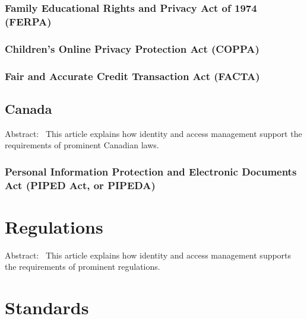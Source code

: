 \hypertarget{family-educational-rights-and-privacy-act-of-1974-ferpa}{%
\subsubsection{Family Educational Rights and Privacy Act of 1974
(FERPA)}\label{family-educational-rights-and-privacy-act-of-1974-ferpa}}

\hypertarget{childrens-online-privacy-protection-act-coppa}{%
\subsubsection{Children's Online Privacy Protection Act
(COPPA)}\label{childrens-online-privacy-protection-act-coppa}}

\hypertarget{fair-and-accurate-credit-transaction-act-facta}{%
\subsubsection{Fair and Accurate Credit Transaction Act
(FACTA)}\label{fair-and-accurate-credit-transaction-act-facta}}

\hypertarget{canada}{%
\subsection{Canada}\label{canada}}

Abstract:~ This article explains how identity and access management
support the requirements of prominent Canadian laws.

\hypertarget{personal-information-protection-and-electronic-documents-act-piped-act-or-pipeda}{%
\subsubsection{Personal Information Protection and Electronic Documents Act
(PIPED Act, or
PIPEDA)}\label{personal-information-protection-and-electronic-documents-act-piped-act-or-pipeda}}

\hypertarget{regulations}{%
\section{Regulations}\label{regulations}}

Abstract:~ This article explains how identity and access management
supports the requirements of prominent regulations.

\hypertarget{standards}{%
\section{Standards}\label{standards}}

